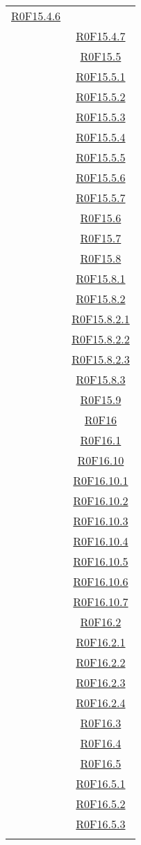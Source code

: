 \documentclass[../AnalisiDeiRequisiti.tex]{subfiles}
\begin{document}
\begin{longtable}{|c|c|}
\hyperlink{R0F15.4.6}{R0F15.4.6}\\& \hyperlink{R0F15.4.7}{R0F15.4.7}\\& \hyperlink{R0F15.5}{R0F15.5}\\& \hyperlink{R0F15.5.1}{R0F15.5.1}\\& \hyperlink{R0F15.5.2}{R0F15.5.2}\\& \hyperlink{R0F15.5.3}{R0F15.5.3}\\& \hyperlink{R0F15.5.4}{R0F15.5.4}\\& \hyperlink{R0F15.5.5}{R0F15.5.5}\\& \hyperlink{R0F15.5.6}{R0F15.5.6}\\& \hyperlink{R0F15.5.7}{R0F15.5.7}\\& \hyperlink{R0F15.6}{R0F15.6}\\& \hyperlink{R0F15.7}{R0F15.7}\\& \hyperlink{R0F15.8}{R0F15.8}\\& \hyperlink{R0F15.8.1}{R0F15.8.1}\\& \hyperlink{R0F15.8.2}{R0F15.8.2}\\& \hyperlink{R0F15.8.2.1}{R0F15.8.2.1}\\& \hyperlink{R0F15.8.2.2}{R0F15.8.2.2}\\& \hyperlink{R0F15.8.2.3}{R0F15.8.2.3}\\& \hyperlink{R0F15.8.3}{R0F15.8.3}\\& \hyperlink{R0F15.9}{R0F15.9}\\& \hyperlink{R0F16}{R0F16}\\& \hyperlink{R0F16.1}{R0F16.1}\\& \hyperlink{R0F16.10}{R0F16.10}\\& \hyperlink{R0F16.10.1}{R0F16.10.1}\\& \hyperlink{R0F16.10.2}{R0F16.10.2}\\& \hyperlink{R0F16.10.3}{R0F16.10.3}\\& \hyperlink{R0F16.10.4}{R0F16.10.4}\\& \hyperlink{R0F16.10.5}{R0F16.10.5}\\& \hyperlink{R0F16.10.6}{R0F16.10.6}\\& \hyperlink{R0F16.10.7}{R0F16.10.7}\\& \hyperlink{R0F16.2}{R0F16.2}\\& \hyperlink{R0F16.2.1}{R0F16.2.1}\\& \hyperlink{R0F16.2.2}{R0F16.2.2}\\& \hyperlink{R0F16.2.3}{R0F16.2.3}\\& \hyperlink{R0F16.2.4}{R0F16.2.4}\\& \hyperlink{R0F16.3}{R0F16.3}\\& \hyperlink{R0F16.4}{R0F16.4}\\& \hyperlink{R0F16.5}{R0F16.5}\\& \hyperlink{R0F16.5.1}{R0F16.5.1}\\& \hyperlink{R0F16.5.2}{R0F16.5.2}\\& \hyperlink{R0F16.5.3}{R0F16.5.3}\\& 
\end{longtable}
\end{document}
